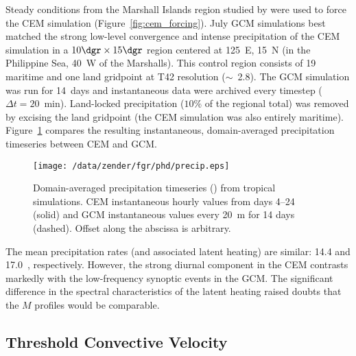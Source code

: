 \documentclass[twoside,agums]{aguplus}
\begin{document}
Steady conditions from the Marshall Islands region studied by
\cite{YEC73} were used to force the CEM simulation
(Figure~\ref{fig:cem_forcing}). 
July GCM simulations best matched the strong low-level convergence and
intense precipitation of the CEM simulation in a $10\dgr \times
15\dgr$ region centered at 125~\dgr E, 15~\dgr N
(in the Philippine Sea, 40~\dgr W of the Marshalls). 
This control region consists of 19 maritime and one land gridpoint
at T42 resolution ($\sim$~2.8\dgr).
The GCM simulation was run for 14~days and instantaneous data were
archived every timestep ($\Delta t = 20$~min). 
Land-locked precipitation ($10\%$ of the regional total) was removed 
by excising the land gridpoint (the CEM simulation was also entirely
maritime). 
Figure~\ref{fig:precip} compares the resulting instantaneous,
domain-averaged precipitation timeseries between CEM and GCM.
\begin{figure}
\begin{center}
\texttt{[image: /data/zender/fgr/phd/precip.eps]}
\end{center}
\caption[Domain-averaged precipitation timeseries from tropical
simulations]{
Domain-averaged precipitation timeseries (\mmxday) from tropical
simulations.   
CEM instantaneous hourly values from days 4--24 (solid) and GCM
instantaneous values every 20~m for 14 days (dashed). 
Offset along the abscissa is arbitrary.\label{fig:precip}}
\end{figure}
The mean precipitation rates (and associated latent heating) are
similar: 14.4 and 17.0~\mmxday, respectively.
However, the strong diurnal component in the CEM contrasts markedly
with the low-frequency synoptic events in the GCM.
The significant difference in the spectral characteristics of the
latent heating raised doubts that the $M$ profiles would be
comparable. 

\subsection{Threshold Convective Velocity}
\end{document}
